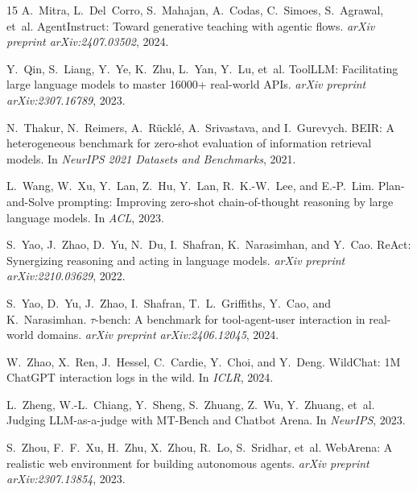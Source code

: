 \documentclass[10pt,twocolumn]{article}
\begin{document}
\begin{thebibliography}{15}
A.~Mitra, L.~Del~Corro, S.~Mahajan, A.~Codas, C.~Simoes, S.~Agrawal,
  et~al.
\newblock AgentInstruct: Toward generative teaching with agentic flows.
\newblock \emph{arXiv preprint arXiv:2407.03502}, 2024.

Y.~Qin, S.~Liang, Y.~Ye, K.~Zhu, L.~Yan, Y.~Lu, et~al.
\newblock ToolLLM: Facilitating large language models to master 16000+
  real-world APIs.
\newblock \emph{arXiv preprint arXiv:2307.16789}, 2023.

N.~Thakur, N.~Reimers, A.~R{\"u}ckl{\'e}, A.~Srivastava, and I.~Gurevych.
\newblock BEIR: A heterogeneous benchmark for zero-shot evaluation of
  information retrieval models.
\newblock In \emph{NeurIPS 2021 Datasets and Benchmarks}, 2021.

L.~Wang, W.~Xu, Y.~Lan, Z.~Hu, Y.~Lan, R.~K.-W.~Lee, and E.-P.~Lim.
\newblock Plan-and-Solve prompting: Improving zero-shot chain-of-thought
  reasoning by large language models.
\newblock In \emph{ACL}, 2023.

S.~Yao, J.~Zhao, D.~Yu, N.~Du, I.~Shafran, K.~Narasimhan, and Y.~Cao.
\newblock ReAct: Synergizing reasoning and acting in language models.
\newblock \emph{arXiv preprint arXiv:2210.03629}, 2022.

S.~Yao, D.~Yu, J.~Zhao, I.~Shafran, T.~L.~Griffiths, Y.~Cao, and
  K.~Narasimhan.
\newblock $\tau$-bench: A benchmark for tool-agent-user interaction in
  real-world domains.
\newblock \emph{arXiv preprint arXiv:2406.12045}, 2024.

W.~Zhao, X.~Ren, J.~Hessel, C.~Cardie, Y.~Choi, and Y.~Deng.
\newblock WildChat: 1M ChatGPT interaction logs in the wild.
\newblock In \emph{ICLR}, 2024.

L.~Zheng, W.-L.~Chiang, Y.~Sheng, S.~Zhuang, Z.~Wu, Y.~Zhuang, et~al.
\newblock Judging LLM-as-a-judge with MT-Bench and Chatbot Arena.
\newblock In \emph{NeurIPS}, 2023.

S.~Zhou, F.~F.~Xu, H.~Zhu, X.~Zhou, R.~Lo, S.~Sridhar, et~al.
\newblock WebArena: A realistic web environment for building autonomous agents.
\newblock \emph{arXiv preprint arXiv:2307.13854}, 2023.

\end{thebibliography}
\end{document}
